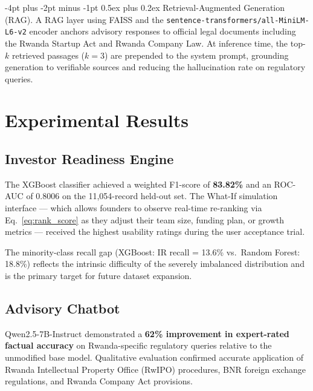 \documentclass{article}
\makeatletter
\renewcommand\paragraph{\@startsection{paragraph}{4}{\z@}%
  {-4pt plus -2pt minus -1pt}%
  {0.5ex plus 0.2ex}%
  {\normalsize\bf}}
\makeatother
\begin{document}
\paragraph{Retrieval-Augmented Generation (RAG).}
A RAG layer using FAISS and the
\texttt{sentence-transformers/all-MiniLM-L6-v2} encoder anchors advisory
responses to official legal documents including the Rwanda Startup Act and
Rwanda Company Law. At inference time, the top-$k$ retrieved passages ($k=3$)
are prepended to the system prompt, grounding generation to verifiable sources
and reducing the hallucination rate on regulatory queries.


\FloatBarrier
\section{Experimental Results}

\FloatBarrier
\subsection{Investor Readiness Engine}

The XGBoost classifier achieved a weighted F1-score of \textbf{83.82\%}
and an ROC-AUC of 0.8006 on the 11{,}054-record held-out set.
The What-If simulation interface --- which allows founders to observe
real-time re-ranking via Eq.~\eqref{eq:rank_score} as they adjust their
team size, funding plan, or growth metrics --- received the highest
usability ratings during the user acceptance trial.

The minority-class recall gap (XGBoost: IR recall = 13.6\% vs.\
Random Forest: 18.8\%) reflects the intrinsic difficulty of the
severely imbalanced distribution and is the primary target for future
dataset expansion.

\FloatBarrier
\subsection{Advisory Chatbot}

Qwen2.5-7B-Instruct demonstrated a \textbf{62\% improvement in expert-rated
factual accuracy} on Rwanda-specific regulatory queries relative to the
unmodified base model. Qualitative evaluation confirmed accurate application
of Rwanda Intellectual Property Office (RwIPO) procedures, BNR foreign
exchange regulations, and Rwanda Company Act provisions.
\end{document}
